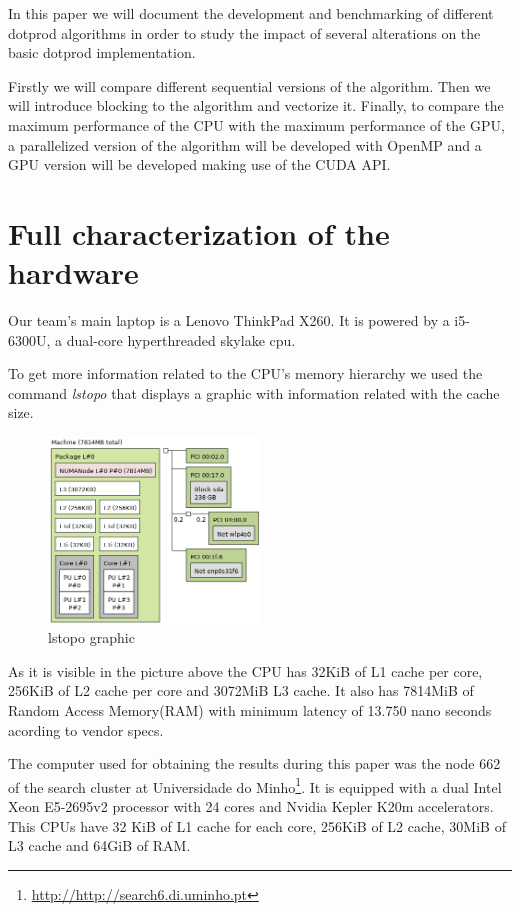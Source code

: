 \documentclass[a4paper]{report}
\begin{document}
In this paper we will document the development and benchmarking of different
dotprod algorithms in order to study the impact of several alterations on the
basic dotprod implementation.

Firstly we will compare different sequential versions of the algorithm. Then we
will introduce blocking to the algorithm and vectorize it. Finally, to compare
the maximum performance of the CPU with the maximum performance of the GPU, a
parallelized version of the algorithm will be developed with OpenMP and a GPU
version will be developed making use of the CUDA API.

\chapter{Full characterization of the hardware}
Our team's main laptop is a Lenovo ThinkPad X260. It is powered by a i5-6300U, a
dual-core hyperthreaded skylake cpu.

To get more information related to the CPU's memory hierarchy we used the
command \textit{lstopo} that displays a graphic with information related with
the cache size.
\begin{figure}[H]
    \centering
        \includegraphics[width=0.5\textwidth]{images/lstopo.png}
        \caption{lstopo graphic}
\end{figure}

As it is visible in the picture above the CPU has 32KiB of L1 cache per core,
256KiB of L2 cache per core and 3072MiB L3 cache. It also has 7814MiB of Random
Access Memory(RAM) with minimum latency of 13.750 nano seconds acording to
vendor specs.

The computer used for obtaining the results during this paper was the node 662
of the search cluster at Universidade do
Minho\footnote[1]{\url{http://http://search6.di.uminho.pt}}. It is equipped with
a
dual Intel Xeon E5-2695v2 processor
with 24 cores and Nvidia Kepler K20m accelerators. This CPUs have 32 KiB of L1
cache for each core, 256KiB of L2 cache, 30MiB of L3 cache and 64GiB of RAM.
\end{document}
